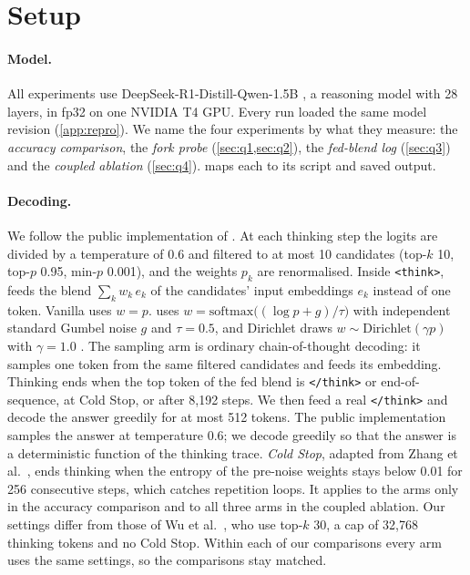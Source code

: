 \section{Setup}\label{sec:setup}

\paragraph{Model.}
All experiments use DeepSeek-R1-Distill-Qwen-1.5B \cite{deepseekai2025r1,guo2025nature}, a reasoning model with 28 layers, %
in fp32 on one NVIDIA T4 GPU. %
Every run loaded the same model revision (\cref{app:repro}).
We name the four experiments by what they measure: the \emph{accuracy comparison}, the \emph{fork probe}
(\cref{sec:q1,sec:q2}), the \emph{fed-blend log} (\cref{sec:q3}) and the \emph{coupled ablation} (\cref{sec:q4}).
 maps each to its script and saved output.

\paragraph{Decoding.}
We follow the public implementation of \ST{} \cite{zhang2025soft}.
At each thinking step the logits are divided by a temperature of 0.6 and filtered to at most 10 candidates %
(top-$k$ 10, top-$p$ 0.95, min-$p$ 0.001), and the weights $p_k$ are renormalised. %
Inside \texttt{<think>}, \ST{} feeds the blend $\sum_k w_k\,e_k$ of the candidates' input embeddings $e_k$
instead of one token.
Vanilla \ST{} uses $w = p$.
\GST{} uses $w = \mathrm{softmax}\big((\log p + g)/\tau\big)$ with independent standard Gumbel noise $g$ and
$\tau = 0.5$, and Dirichlet \ST{} draws $w \sim \mathrm{Dirichlet}(\gamma p)$ with $\gamma = 1.0$ %
\cite{wu2025single}.
The sampling arm is ordinary chain-of-thought decoding: it samples one token from the same filtered candidates
and feeds its embedding.
Thinking ends when the top token of the fed blend is \texttt{</think>} or end-of-sequence, at Cold Stop, or after
8,192 steps. %
We then feed a real \texttt{</think>} and decode the answer greedily for at most 512 tokens. %
The public implementation samples the answer at temperature 0.6; we decode greedily so that the answer is a %
deterministic function of the thinking trace.
\emph{Cold Stop}, adapted from Zhang et al.~\cite{zhang2025soft}, ends thinking when the entropy of the pre-noise weights stays below 0.01 for 256 consecutive steps, %
which catches repetition loops.
It applies to the \ST{} arms only in the accuracy comparison and to all three arms in the coupled ablation.
Our settings differ from those of Wu et al.~\cite{wu2025single}, who use top-$k$ 30, a cap of 32,768 thinking tokens %
and no Cold Stop.
Within each of our comparisons every arm uses the same settings, so the comparisons stay matched.


